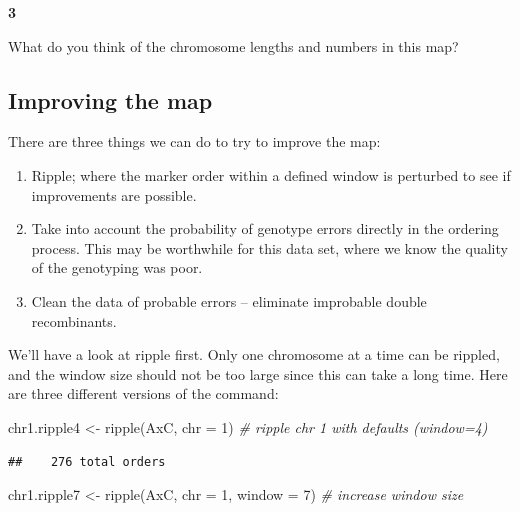 \documentclass[
]{book}
\makeatletter
\newenvironment{Shaded}{\begin{snugshade}}{\end{snugshade}}
\newcommand{\AttributeTok}[1]{\textcolor[rgb]{0.77,0.63,0.00}{#1}}
\newcommand{\CommentTok}[1]{\textcolor[rgb]{0.56,0.35,0.01}{\textit{#1}}}
\newcommand{\DecValTok}[1]{\textcolor[rgb]{0.00,0.00,0.81}{#1}}
\newcommand{\FunctionTok}[1]{\textcolor[rgb]{0.00,0.00,0.00}{#1}}
\newcommand{\NormalTok}[1]{#1}
\newcommand{\OtherTok}[1]{\textcolor[rgb]{0.56,0.35,0.01}{#1}}
\newenvironment{kframe}{%
\medskip{}
\setlength{\fboxsep}{.8em}
 \def\at@end@of@kframe{}%
 \ifinner\ifhmode%
  \def\at@end@of@kframe{\end{minipage}}%
  \begin{minipage}{\columnwidth}%
 \fi\fi%
 \def\FrameCommand##1{\hskip\@totalleftmargin \hskip-\fboxsep
 \colorbox{shadecolor}{##1}\hskip-\fboxsep
     \hskip-\linewidth \hskip-\@totalleftmargin \hskip\columnwidth}%
 \MakeFramed {\advance\hsize-\width
   \@totalleftmargin\z@ \linewidth\hsize
   \@setminipage}}%
 {\par\unskip\endMakeFramed%
 \at@end@of@kframe}
\newenvironment{rmdblock}[1]
  {
  \begin{itemize}
  \renewcommand{\labelitemi}{
    \raisebox{-.7\height}[0pt][0pt]{
      {\setkeys{Gin}{width=3em,keepaspectratio}\texttt{[image: images/\#1]}}
    }
  }
  \setlength{\fboxsep}{1em}
  \begin{kframe}
  \item
  }
  {
  \end{kframe}
  \end{itemize}
  }
\newenvironment{rmdquiz}
  {\begin{rmdblock}{quiz}}
  {\end{rmdblock}}
\makeatother
\begin{document}
\begin{rmdquiz}
\textbf{3}

What do you think of the chromosome lengths and numbers in this map?
\end{rmdquiz}

\hypertarget{improving-the-map}{%
\subsection{Improving the map}\label{improving-the-map}}

There are three things we can do to try to improve the map:

\begin{enumerate}
\def\labelenumi{\arabic{enumi}.}
\item
  Ripple; where the marker order within a defined window is perturbed to see if improvements are possible.
\item
  Take into account the probability of genotype errors directly in the ordering process. This may be worthwhile for this data set, where we know the quality of the genotyping was poor.
\item
  Clean the data of probable errors -- eliminate improbable double recombinants.
\end{enumerate}

We'll have a look at ripple first. Only one chromosome at a time can be rippled, and the window size should not be too large since this can take a long time. Here are three different versions of the command:

\begin{Shaded}
\begin{Highlighting}[]
\NormalTok{chr1.ripple4 }\OtherTok{\textless{}{-}} \FunctionTok{ripple}\NormalTok{(AxC, }\AttributeTok{chr =} \DecValTok{1}\NormalTok{)  }\CommentTok{\# ripple chr 1 with defaults (window=4)}
\end{Highlighting}
\end{Shaded}

\begin{verbatim}
##    276 total orders
\end{verbatim}

\begin{Shaded}
\begin{Highlighting}[]
\NormalTok{chr1.ripple7 }\OtherTok{\textless{}{-}} \FunctionTok{ripple}\NormalTok{(AxC, }\AttributeTok{chr =} \DecValTok{1}\NormalTok{, }\AttributeTok{window =} \DecValTok{7}\NormalTok{)  }\CommentTok{\# increase window size }
\end{Highlighting}
\end{Shaded}
\end{document}
